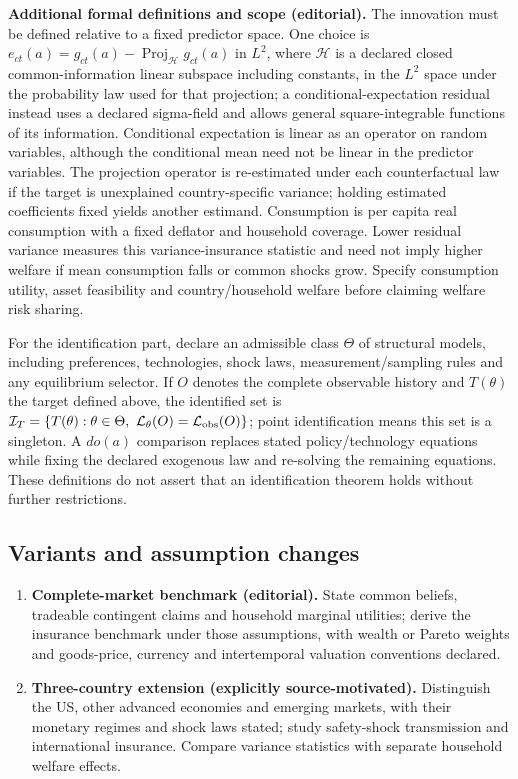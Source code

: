 \documentclass[11pt,a4paper]{article}
\begin{document}
\textbf{Additional formal definitions and scope (editorial).} The innovation must be defined relative to a fixed predictor space. One choice is \(e_{ct}(a)=g_{ct}(a)-\operatorname{Proj}_{\mathcal H}g_{ct}(a)\) in \(L^2\), where \(\mathcal H\) is a declared closed common-information linear subspace including constants, in the \(L^2\) space under the probability law used for that projection; a conditional-expectation residual instead uses a declared sigma-field and allows general square-integrable functions of its information. Conditional expectation is linear as an operator on random variables, although the conditional mean need not be linear in the predictor variables. The projection operator is re-estimated under each counterfactual law if the target is unexplained country-specific variance; holding estimated coefficients fixed yields another estimand. Consumption is per capita real consumption with a fixed deflator and household coverage. Lower residual variance measures this variance-insurance statistic and need not imply higher welfare if mean consumption falls or common shocks grow. Specify consumption utility, asset feasibility and country/household welfare before claiming welfare risk sharing.

For the identification part, declare an admissible class \(\Theta\) of structural models, including preferences, technologies, shock laws, measurement/sampling rules and any equilibrium selector. If \(O\) denotes the complete observable history and \(T(\theta)\) the target defined above, the identified set is \(\mathcal I_T=\{T(\theta):\theta\in\Theta,\ \mathcal L_\theta(O)=\mathcal L_{\rm obs}(O)\}\); point identification means this set is a singleton. A \(do(a)\) comparison replaces stated policy/technology equations while fixing the declared exogenous law and re-solving the remaining equations. These definitions do not assert that an identification theorem holds without further restrictions.
\subsection*{Variants and assumption changes}
\begin{enumerate}
\item \textbf{Complete-market benchmark (editorial).} State common beliefs, tradeable contingent claims and household marginal utilities; derive the insurance benchmark under those assumptions, with wealth or Pareto weights and goods-price, currency and intertemporal valuation conventions declared.
\item \textbf{Three-country extension (explicitly source-motivated).} Distinguish the US, other advanced economies and emerging markets, with their monetary regimes and shock laws stated; study safety-shock transmission and international insurance. Compare variance statistics with separate household welfare effects.
\end{enumerate}
\end{document}

